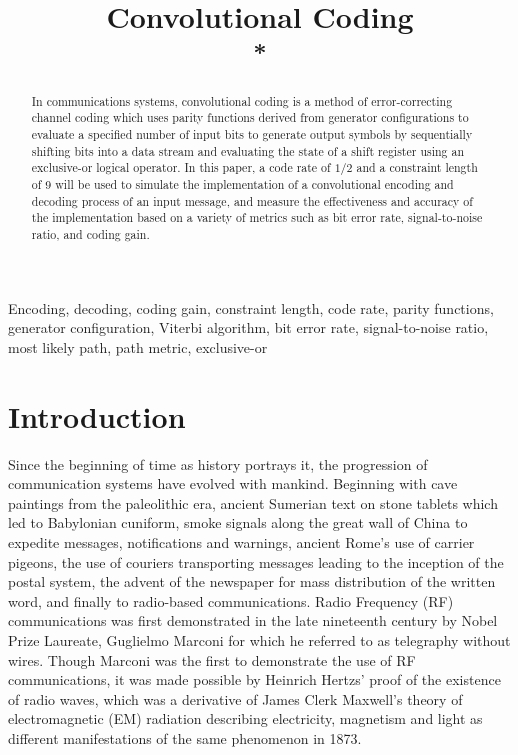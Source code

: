 \documentclass[conference]{IEEEtran}
\begin{document}
\title{Convolutional Coding
\\
\footnotesize \textsuperscript{*}}

\author{
}

\maketitle

\begin{abstract}
In communications systems, convolutional coding is a method of error-correcting channel coding which uses parity functions derived from generator configurations to evaluate a specified number of input bits to generate output symbols by sequentially shifting bits into a data stream and evaluating the state of a shift register using an exclusive-or logical operator. In this paper, a code rate of $1/2$ and a constraint length of 9 will be used to simulate the implementation of a convolutional encoding and decoding process of an input message, and measure the effectiveness and accuracy of the implementation based on a variety of metrics such as bit error rate, signal-to-noise ratio, and coding gain.\\
\end{abstract}

\begin{IEEEkeywords}
Encoding, decoding, coding gain, constraint length, code rate, parity functions, generator configuration, Viterbi algorithm, bit error rate, signal-to-noise ratio, most likely path, path metric, exclusive-or
\end{IEEEkeywords}

\section{Introduction}
Since the beginning of time as history portrays it, the progression of communication systems have evolved with mankind. Beginning with cave paintings from the paleolithic era, ancient Sumerian text on stone tablets which led to Babylonian cuniform, smoke signals along the great wall of China to expedite messages, notifications and warnings, ancient Rome's use of carrier pigeons, the use of couriers transporting messages leading to the inception of the postal system, the advent of the newspaper for mass distribution of the written word, and finally to radio-based communications. Radio Frequency (RF) communications was first demonstrated in the late nineteenth century by Nobel Prize Laureate, Guglielmo Marconi for which he referred to as telegraphy without wires. Though Marconi was the first to demonstrate the use of RF communications, it was made possible by Heinrich Hertzs' proof of the existence of radio waves, which was a derivative of James Clerk Maxwell's theory of electromagnetic (EM) radiation describing electricity, magnetism and light as different manifestations of the same phenomenon in 1873.\\
\end{document}
